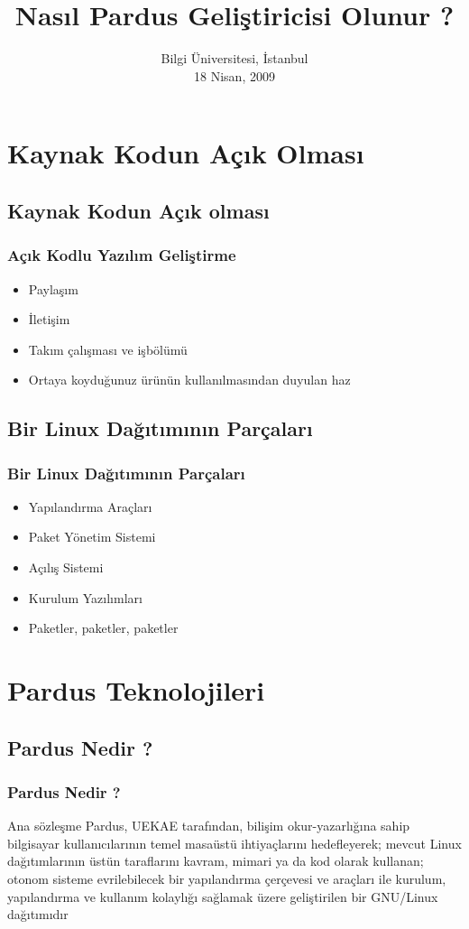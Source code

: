\documentclass{beamer}
\title{Nasıl Pardus Geliştiricisi Olunur ?}
\author[Onur Küçük \texttt{onur@pardus.org.tr}]{}
\date{Bilgi Üniversitesi, İstanbul\\ 18 Nisan, 2009}
\institute{
  Ulusal Elektronik ve Kriptoloji Araştırma Enstitüsü\\
  TÜBİTAK}
\begin{document}
\frame{\titlepage}

\section{Kaynak Kodun Açık Olması}

\subsection{Kaynak Kodun Açık olması}
\frame
{
    \frametitle{Açık Kodlu Yazılım Geliştirme}
    \begin{itemize}
       \item Paylaşım
       \item İletişim
       \item Takım çalışması ve işbölümü
       \item Ortaya koyduğunuz ürünün kullanılmasından duyulan haz
    \end{itemize}
}

\subsection{Bir Linux Dağıtımının Parçaları}
\frame
{
    \frametitle{Bir Linux Dağıtımının Parçaları}
    \begin{itemize}
       \item Yapılandırma Araçları
       \item Paket Yönetim Sistemi
       \item Açılış Sistemi
       \item Kurulum Yazılımları
       \item Paketler, paketler, paketler
    \end{itemize}
}

\section{Pardus Teknolojileri}

\subsection{Pardus Nedir ?}
\frame
{
    \frametitle{Pardus Nedir ?}
    \begin{block}{Ana sözleşme}
        Pardus, UEKAE tarafından, bilişim okur-yazarlığına sahip bilgisayar kullanıcılarının temel masaüstü ihtiyaçlarını hedefleyerek; mevcut Linux dağıtımlarının üstün taraflarını kavram, mimari ya da kod olarak kullanan; otonom sisteme evrilebilecek bir yapılandırma çerçevesi ve araçları ile kurulum, yapılandırma ve kullanım kolaylığı sağlamak üzere geliştirilen bir GNU/Linux dağıtımıdır
    \end{block}
}
\end{document}
